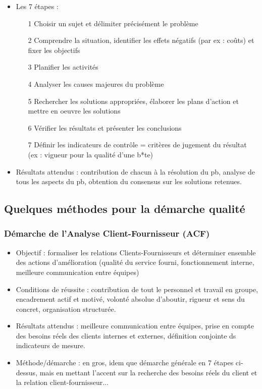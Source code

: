 \begin{itemize}
			\item Les 7 étapes : 
				\begin{itemize}
				\item[1] Choisir un sujet et délimiter précisément le problème
				\item[2] Comprendre la situation, identifier les effets négatifs (par ex : coûts) et fixer les objectifs
				\item[3] Planifier les activités
				\item[4] Analyser les causes majeures du problème
				\item[5] Rechercher les solutions appropriées, élaborer les plans d'action et mettre en oeuvre les solutions
				\item[6] Vérifier les résultats et présenter les conclusions
				\item[7] Définir les indicateurs de contrôle = critères de jugement du résultat (ex : vigueur pour la qualité d'une b*te) 
				\end{itemize}
			\item Résultats attendus : contribution de chacun à la résolution du pb, analyse de tous les aspects du pb, obtention du consensus sur les solutions retenues. 
			\end{itemize}
		\subsection{Quelques méthodes pour la démarche qualité}
			\subsubsection{Démarche de l'Analyse Client-Fournisseur (ACF)}
				\begin{itemize}
				\item Objectif : formaliser les relations Clients-Fournisseurs et déterminer ensemble des actions d'amélioration (qualité du service fourni, fonctionnement interne, meilleure communication entre équipes)
				\item Conditions de réussite : contribution de tout le personnel et travail en groupe, encadrement actif et motivé, volonté absolue d'aboutir, rigueur et sens du concret, organisation structurée. 
				\item Résultats attendus : meilleure communication entre équipes, prise en compte des besoins réels des clients internes et externes, définition conjointe ds indicateurs de mesure. 
				\item Méthode/démarche : en gros, idem que démarche générale en 7 étapes ci-dessus, mais en mettant l'accent sur la recherche des besoins réels du client et la relation client-fournisseur... 
				\end{itemize}

